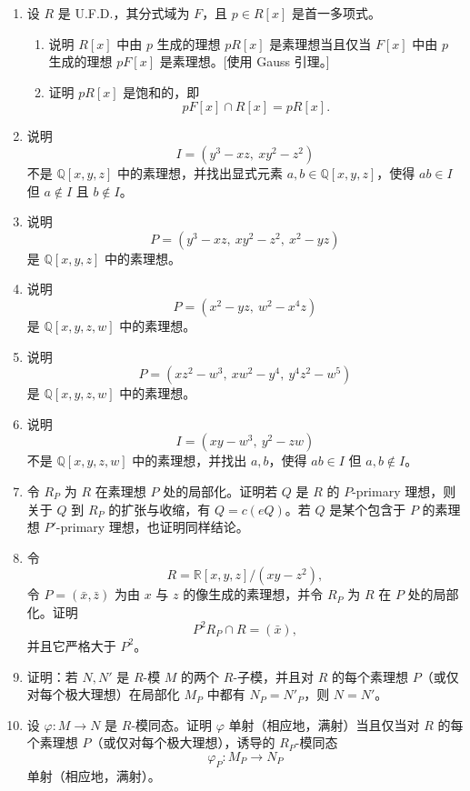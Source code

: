 \begin{enumerate}[label=\arabic*.]
	\item 设 $R$ 是 U.F.D.，其分式域为 $F$，且 $p\in R[x]$ 是首一多项式。
	\begin{enumerate}[label=(\alph*)]
		\item 说明 $R[x]$ 中由 $p$ 生成的理想 $pR[x]$ 是素理想当且仅当 $F[x]$ 中由 $p$ 生成的理想 $pF[x]$ 是素理想。[使用 Gauss 引理。]
		\item 证明 $pR[x]$ 是饱和的，即
		\[
		pF[x]\cap R[x]=pR[x].
		\]
	\end{enumerate}
	
	\item 说明
	\[
	I=(y^3-xz,\ xy^2-z^2)
	\]
	不是 $\mathbb Q[x,y,z]$ 中的素理想，并找出显式元素 $a,b\in\mathbb Q[x,y,z]$，使得 $ab\in I$ 但 $a\notin I$ 且 $b\notin I$。
	
	\item 说明
	\[
	P=(y^3-xz,\ xy^2-z^2,\ x^2-yz)
	\]
	是 $\mathbb Q[x,y,z]$ 中的素理想。
	
	\item 说明
	\[
	P=(x^2-yz,\ w^2-x^4z)
	\]
	是 $\mathbb Q[x,y,z,w]$ 中的素理想。
	
	\item 说明
	\[
	P=(xz^2-w^3,\ xw^2-y^4,\ y^4z^2-w^5)
	\]
	是 $\mathbb Q[x,y,z,w]$ 中的素理想。
	
	\item 说明
	\[
	I=(xy-w^3,\ y^2-zw)
	\]
	不是 $\mathbb Q[x,y,z,w]$ 中的素理想，并找出 $a,b$，使得 $ab\in I$ 但 $a,b\notin I$。
	
	\item 令 $R_P$ 为 $R$ 在素理想 $P$ 处的局部化。证明若 $Q$ 是 $R$ 的 $P$-primary 理想，则关于 $Q$ 到 $R_P$ 的扩张与收缩，有 $Q=c(eQ)$。若 $Q$ 是某个包含于 $P$ 的素理想 $P'$-primary 理想，也证明同样结论。
	
	\item 令
	\[
	R=\mathbb R[x,y,z]/(xy-z^2),
	\]
	令 $P=(\bar x,\bar z)$ 为由 $x$ 与 $z$ 的像生成的素理想，并令 $R_P$ 为 $R$ 在 $P$ 处的局部化。证明
	\[
	P^2R_P\cap R=(\bar x),
	\]
	并且它严格大于 $P^2$。
	
	\item 证明：若 $N,N'$ 是 $R$-模 $M$ 的两个 $R$-子模，并且对 $R$ 的每个素理想 $P$（或仅对每个极大理想）在局部化 $M_P$ 中都有 $N_P=N'_P$，则 $N=N'$。
	
	\item 设 $\varphi:M\to N$ 是 $R$-模同态。证明 $\varphi$ 单射（相应地，满射）当且仅当对 $R$ 的每个素理想 $P$（或仅对每个极大理想），诱导的 $R_P$-模同态
	\[
	\varphi_P:M_P\to N_P
	\]
	单射（相应地，满射）。
	

\end{enumerate}
